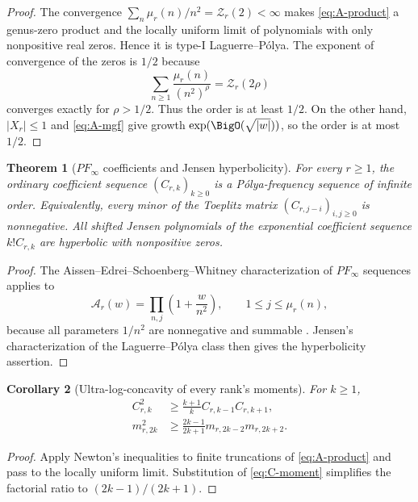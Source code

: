 \documentclass[11pt,oneside]{article}
\newtheorem{theorem}{Theorem}[section]
\newtheorem{corollary}[theorem]{Corollary}
\theoremstyle{definition}
\theoremstyle{remark}
\newcommand{\ZetaR}{\mathcal Z}
\newcommand{\Ar}{\mathcal A}
\begin{document}
\begin{proof}
The convergence
$\sum_n\mu_r(n)/n^2=\ZetaR_r(2)<\infty$ makes
\eqref{eq:A-product} a genus-zero product and the locally uniform limit of
polynomials with only nonpositive real zeros.  Hence it is type-I
Laguerre--P\'olya.  The exponent of convergence of the zeros is $1/2$ because
\[
 \sum_{n\geq1}\frac{\mu_r(n)}{(n^2)^\rho}=\ZetaR_r(2\rho)
\]
converges exactly for $\rho>1/2$.  Thus the order is at least $1/2$.
On the other hand, $|X_r|\leq1$ and \eqref{eq:A-mgf} give growth
$\exp(\BigO(\sqrt{|w|}))$, so the order is at most $1/2$.
\end{proof}

\begin{theorem}[$PF_\infty$ coefficients and Jensen hyperbolicity]\label{thm:PF-all}
For every $r\geq1$, the ordinary coefficient sequence
$(C_{r,k})_{k\geq0}$ is a P\'olya-frequency sequence of infinite order.
Equivalently, every minor of the Toeplitz matrix
$(C_{r,j-i})_{i,j\geq0}$ is nonnegative.  All shifted Jensen polynomials of
the exponential coefficient sequence $k!C_{r,k}$ are hyperbolic with
nonpositive zeros.
\end{theorem}

\begin{proof}
The Aissen--Edrei--Schoenberg--Whitney characterization of $PF_\infty$
sequences applies to
\[
 \Ar_r(w)=\prod_{n,j}\left(1+\frac{w}{n^2}\right),
 \qquad 1\leq j\leq\mu_r(n),
\]
because all parameters $1/n^2$ are nonnegative and summable
\cite{aesw}.  Jensen's characterization of the Laguerre--P\'olya class then
gives the hyperbolicity assertion.
\end{proof}

\begin{corollary}[Ultra-log-concavity of every rank's moments]\label{cor:ULC}
For $k\geq1$,
\begin{align}
 C_{r,k}^2&\geq\frac{k+1}{k}C_{r,k-1}C_{r,k+1},\label{eq:C-ULC}\\
 m_{r,2k}^2&\geq\frac{2k-1}{2k+1}
 m_{r,2k-2}m_{r,2k+2}.\label{eq:moment-ULC}
\end{align}
\end{corollary}

\begin{proof}
Apply Newton's inequalities to finite truncations of
\eqref{eq:A-product} and pass to the locally uniform limit.  Substitution of
\eqref{eq:C-moment} simplifies the factorial ratio to
$(2k-1)/(2k+1)$.
\end{proof}
\end{document}
